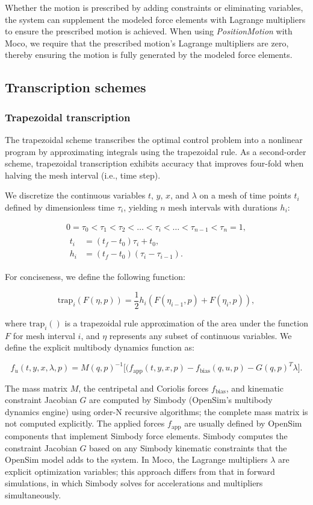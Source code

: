 \documentclass[10pt,letterpaper]{article}
\newcommand{\traptau}{
\begin{equation}
    \begin{gathered}
        0 = \tau_0 < \tau_1 < \tau_2 < \ldots < \tau_i < \ldots < \tau_{n - 1} < \tau_n = 1, \\
        \begin{aligned}
        t_i &= (t_f - t_0) \tau_i + t_0, \\
        h_i &= (t_f - t_0)(\tau_i - \tau_{i-1}).
        \end{aligned}
    \end{gathered}
\end{equation}
}
\newcommand{\trapfunc}{
\begin{equation}
    \textrm{trap}_i(F(\eta, p)) = \frac{1}{2} h_i (F(\eta_{i-1}, p) + F(\eta_i, p)),
\end{equation}
}
\newcommand{\explicitmultibody}{
\begin{equation}
    f_{\dot{u}}(t, y, x, \lambda, p) =
    M(q, p)^{-1}\big[(f_{\textrm{app}}(t, y, x, p) - f_{\textrm{bias}}(q, u, p) - G(q, p)^T \lambda\big].
\end{equation}
}
\begin{document}
Whether the motion is prescribed by adding constraints or eliminating variables, the system can supplement the modeled force elements with Lagrange multipliers to ensure the prescribed motion is achieved. When using \textit{PositionMotion} with Moco, we require that the prescribed motion’s Lagrange multipliers are zero, thereby ensuring the motion is fully generated by the modeled force elements.

\subsection*{Transcription schemes}

\subsubsection*{Trapezoidal transcription}

The trapezoidal scheme transcribes the optimal control problem into a nonlinear program by approximating integrals using the trapezoidal rule. As a second-order scheme, trapezoidal transcription exhibits accuracy that improves four-fold when halving the mesh interval (i.e., time step).

We discretize the continuous variables $t$, $y$, $x$, and $\lambda$ on a mesh of time points $t_i$ defined by dimensionless time $\tau_i$, yielding $n$ mesh intervals with durations $h_i$:

\traptau

For conciseness, we define the following function:

\trapfunc

where $\mathrm{trap}_i()$ is a trapezoidal rule approximation of the area under the function $F$ for mesh interval $i$, and $\eta$ represents any subset of continuous variables. We define the explicit multibody dynamics function as:

\explicitmultibody

The mass matrix $M$, the centripetal and Coriolis forces $f_\mathrm{bias}$, and kinematic constraint Jacobian $G$ are computed by Simbody (OpenSim's multibody dynamics engine) using order-N recursive algorithms; the complete mass matrix is not computed explicitly. The applied forces $f_\mathrm{app}$ are usually defined by OpenSim components that implement Simbody force elements. Simbody computes the constraint Jacobian $G$ based on any Simbody kinematic constraints that the OpenSim model adds to the system. In Moco, the Lagrange multipliers $\lambda$ are explicit optimization variables; this approach differs from that in forward simulations, in which Simbody solves for accelerations and multipliers simultaneously.
\end{document}
